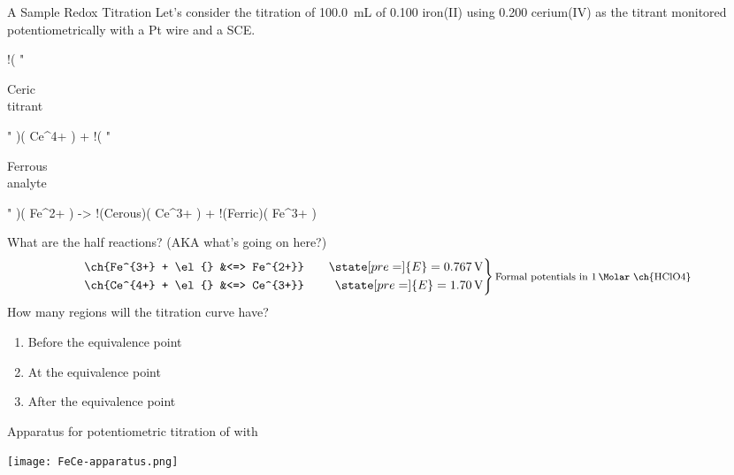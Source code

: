 \documentclass[notes=show]{beamer}
\begin{document}
\begin{frame}{A Sample Redox Titration}
	Let's consider the titration of \SI{100.0}{\milli\liter} of
	\SI{0.100}{\Molar} iron(II) using \SI{0.200}{\Molar} cerium(IV) as the
	titrant monitored potentiometrically with a Pt wire and a SCE.
	\begin{reaction*}
		!( "\parbox{\widthof{~titrant~}}{\centering Ceric\\ titrant}" )( Ce^{4+} ) +
		!( "\parbox{\widthof{~analyte~}}{\centering Ferrous\\ analyte}" )( Fe^{2+} ) ->
		!(Cerous)( Ce^{3+} ) + !(Ferric)( Fe^{3+} )
	\end{reaction*}
	\pause
	What are the half reactions? (AKA what's going on here?)
	\pause
	\begin{equation*}
		\left.\begin{aligned}
		\ch{Fe^{3+} + \el{} &<=> Fe^{2+}} &&\quad
		\state[pre=]{E} =
		\SI{0.767}{\volt} \\
		\ch{Ce^{4+} + \el{} &<=> Ce^{3+}} &&\quad
		\state[pre=]{E} =
		\SI{1.70}{\volt}
		\end{aligned}\right\}
		\text{\footnotesize Formal potentials in \SI{1}{\Molar}
	\ch{HClO4}}
	\end{equation*}
	\pause
	How many regions will the titration curve have?
	\pause
	\begin{enumerate}
		\item Before the equivalence point
		\item At the equivalence point
		\item After the equivalence point
	\end{enumerate}
\end{frame}

\begin{frame}{Apparatus for potentiometric titration of  with
	}
	\begin{center}
		\texttt{[image: FeCe-apparatus.png]}
	\end{center}
\end{frame}

\end{document}
